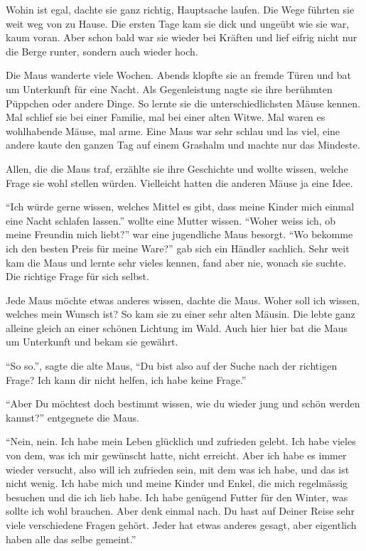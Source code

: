Wohin ist egal, dachte sie ganz richtig, Hauptsache laufen. Die Wege führten sie weit weg von zu Hause. Die ersten Tage kam sie dick und ungeübt wie sie war, kaum voran. Aber schon bald war sie wieder bei Kräften und lief eifrig nicht nur die Berge runter, sondern auch wieder hoch.

Die Maus wanderte viele Wochen. Abends klopfte sie an fremde Türen und bat um Unterkunft für eine Nacht. Als Gegenleistung nagte sie ihre berühmten Püppchen oder andere Dinge. So lernte sie die unterschiedlichsten Mäuse kennen. Mal schlief sie bei einer Familie, mal bei einer alten Witwe. Mal waren es wohlhabende Mäuse, mal arme. Eine Maus war sehr schlau und las viel, eine andere kaute den ganzen Tag auf einem Grashalm und machte nur das Mindeste.

Allen, die die Maus traf, erzählte sie ihre Geschichte und wollte wissen, welche Frage sie wohl stellen würden. Vielleicht hatten die anderen Mäuse ja eine Idee.

\enquote{Ich würde gerne wissen, welches Mittel es gibt, dass meine Kinder mich
einmal eine Nacht schlafen lassen.} wollte eine Mutter wissen. \enquote{Woher
weiss ich, ob meine Freundin mich liebt?} war eine jugendliche Maus besorgt. \enquote{Wo bekomme ich den besten Preis für meine Ware?} gab sich ein Händler sachlich. Sehr weit kam die Maus und lernte sehr vieles kennen, fand aber nie, wonach sie suchte. Die richtige Frage für sich selbst.

Jede Maus möchte etwas anderes wissen, dachte die Maus. Woher soll ich wissen, welches mein Wunsch ist? So kam sie zu einer sehr alten Mäusin. Die lebte ganz alleine gleich an einer schönen Lichtung im Wald. Auch hier hier bat die Maus um Unterkunft und bekam sie gewährt. 

\enquote{So so.}, sagte die alte Maus, \enquote{Du bist also auf der Suche nach der richtigen Frage? Ich kann dir nicht helfen, ich habe keine Frage.} 

\enquote{Aber Du möchtest doch bestimmt wissen, wie du wieder jung und schön werden kannst?} entgegnete die Maus.

\enquote{Nein, nein. Ich habe mein Leben glücklich und zufrieden gelebt. Ich habe vieles von dem, was ich mir gewünscht hatte, nicht erreicht. Aber ich habe es immer wieder versucht, also will ich zufrieden sein, mit dem was ich habe, und das ist nicht wenig. Ich habe mich und meine Kinder und Enkel, die mich regelmässig besuchen und die ich lieb habe. Ich habe genügend Futter für den Winter, was sollte ich wohl brauchen. Aber denk einmal nach. Du hast auf Deiner Reise sehr viele verschiedene Fragen gehört. Jeder hat etwas anderes gesagt, aber eigentlich haben alle das selbe gemeint.}

